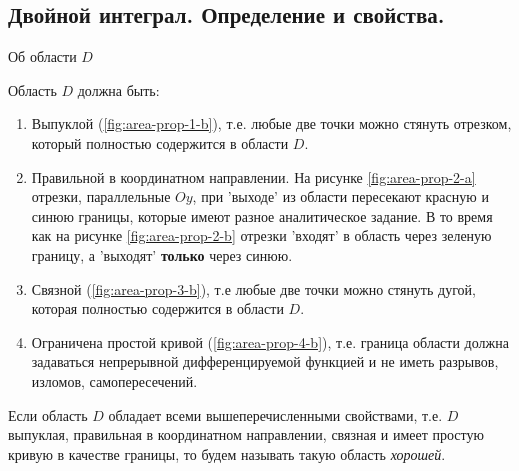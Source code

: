 \subsection{%
  Двойной интеграл. Определение и свойства.%
}

\setlength{\columnseprule}{1pt}
\begin{twocolumns}
  
  

  \columnbreak

  
  
\end{twocolumns}
\setlength{\columnseprule}{0pt}

\begin{remark}
  Об области \(D\)

  Область \(D\) должна быть:
  \begin{enumerate}
    \item Выпуклой (\ref{fig:area-prop-1-b}), т.е. любые две точки можно стянуть
    отрезком, который полностью содержится в области \(D\).

    \item Правильной в координатном направлении. На рисунке
    \ref{fig:area-prop-2-a} отрезки, параллельные \(Oy\), при 'выходе' из
    области пересекают красную и синюю границы, которые имеют разное
    аналитическое задание. В то время как на рисунке \ref{fig:area-prop-2-b}
    отрезки 'входят' в область через зеленую границу, а 'выходят'
    \textbf{только} через синюю.

    \item Связной (\ref{fig:area-prop-3-b}), т.е любые две точки можно стянуть
    дугой, которая полностью содержится в области \(D\).

    \item Ограничена простой кривой (\ref{fig:area-prop-4-b}), т.е. граница
    области должна задаваться непрерывной дифференцируемой функцией и не иметь
    разрывов, изломов, самопересечений.
  \end{enumerate}
\end{remark}

\begin{remark}\label{area-good-def}
  Если область \(D\) обладает всеми вышеперечисленными свойствами, т.е. \(D\)
  выпуклая, правильная в координатном направлении, связная и имеет простую
  кривую в качестве границы, то будем называть такую область \textit{хорошей}.
\end{remark}

